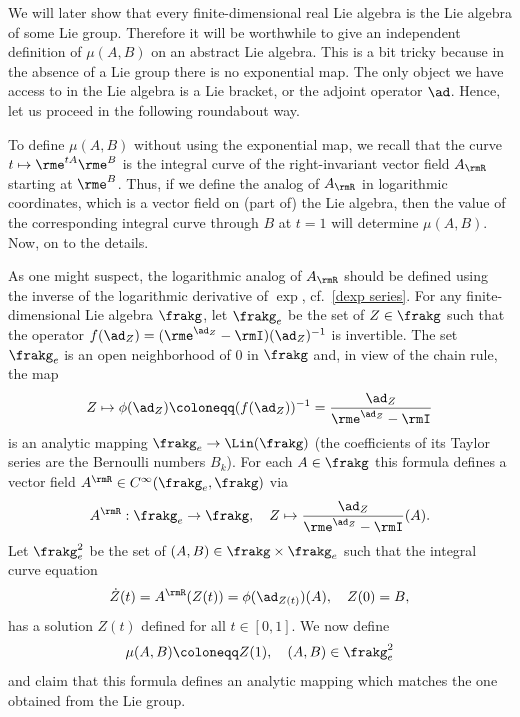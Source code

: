 We will later show that every finite-dimensional real Lie algebra is the Lie algebra of some Lie group. Therefore it will be worthwhile to give an independent definition of $\mu(A,B)$ on an abstract Lie algebra. This is a bit tricky because in the absence of a Lie group there is no exponential map. The only object we have access to in the Lie algebra is a Lie bracket, or the adjoint operator $\ad$. Hence, let us proceed in the following roundabout way. 

To define $\mu(A,B)$ without using the exponential map, we recall that the curve $t\mapsto \rme^{tA}\rme^B$ is the integral curve of the right-invariant vector field $A_\rmR$ starting at $\rme^B$. Thus, if we define the analog of $A_\rmR$ in logarithmic coordinates, which is a vector field on (part of) the Lie algebra, then the value of the corresponding integral curve through $B$ at $t=1$ will determine $\mu(A,B)$. Now, on to the details.

As one might suspect, the logarithmic analog of $A_\rmR$ should be defined using the inverse of the logarithmic derivative of $\exp$, cf.\ \ref{dexp series}. For any finite-dimensional Lie algebra $\frakg$, let $\frakg_e$ be the set of $Z\in \frakg$ such that the operator $f(\ad_Z)=(\rme^{\ad_Z}-\rmI)(\ad_Z)^{-1}$ is invertible. The set $\frakg_e$ is an open neighborhood of $0$ in $\frakg$ and, in view of the chain rule, the map
\[Z\mapsto \phi(\ad_Z)\coloneqq (f(\ad_Z))^{-1}=\frac{\ad_Z}{\rme^{\ad_Z}-\rmI}\label{eq 1.6.1 DK}\]
is an analytic mapping $\frakg_e\to \Lin(\frakg)$ (the coefficients of its Taylor series are the Bernoulli numbers $B_k$). For each $A\in \frakg$ this formula defines a vector field $A^\rmR\in C^\infty(\frakg_e,\frakg)$ via
\[A^\rmR:\frakg_e\to \frakg,\quad Z\mapsto \frac{\ad_Z}{\rme^{\ad_Z}-\rmI}(A).\]
Let $\frakg_e^2$ be the set of $(A,B)\in \frakg\times\frakg_e$ such that the integral curve equation
\[\dot Z(t)=A^\rmR(Z(t))=\phi(\ad_{Z(t)})(A),\quad Z(0)=B,\label{eq Z(t)}\]
has a solution $Z(t)$ defined for all $t\in [0,1]$. We now define
\[\mu(A,B)\coloneqq Z(1),\quad (A,B)\in\frakg_e^2 \label{def local mu}\]
and claim that this formula defines an analytic mapping which matches the one obtained from the Lie group.


